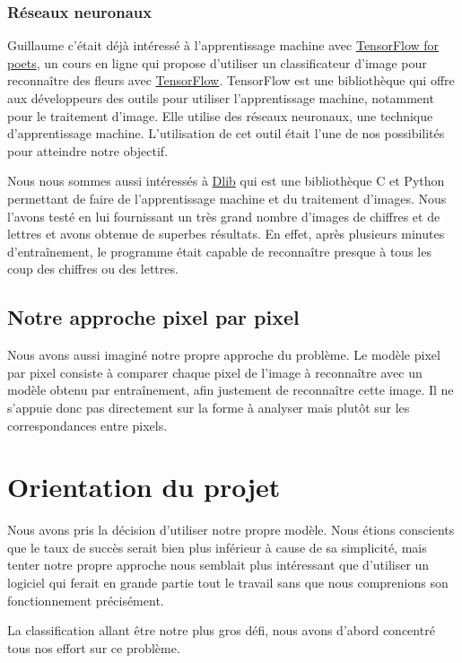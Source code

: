 \documentclass[a4paper, 12pt]{article}
\begin{document}
\subsubsection{Réseaux neuronaux}
Guillaume c'était déjà intéressé à l'apprentissage machine avec \href{https://codelabs.developers.google.com/codelabs/tensorflow-for-poets/}{TensorFlow for poets}, un cours en ligne qui propose d'utiliser un classificateur d'image pour reconnaître des fleurs avec \href{https://www.tensorflow.org/}{TensorFlow}. TensorFlow est une bibliothèque qui offre aux développeurs des outils pour utiliser l'apprentissage machine, notamment pour le traitement d'image. Elle utilise des réseaux neuronaux, une technique d'apprentissage machine. L'utilisation de cet outil était l'une de nos possibilités pour atteindre notre objectif.

Nous nous sommes aussi intéressés à \href{http://dlib.net}{Dlib} qui est une bibliothèque C et Python permettant de faire de l'apprentissage machine et du traitement d'images. Nous l'avons testé en lui fournissant un très grand nombre d'images de chiffres et de lettres et avons obtenue de superbes résultats. En effet, après plusieurs minutes d'entraînement, le programme était capable de reconnaître presque à tous les coup des chiffres ou des lettres.

\subsection{Notre approche pixel par pixel}
Nous avons aussi imaginé notre propre approche du problème. Le modèle pixel par pixel consiste à comparer chaque pixel de l'image à reconnaître avec un modèle obtenu par entraînement, afin justement de reconnaître cette image. Il ne s'appuie donc pas directement sur la forme à analyser mais plutôt sur les correspondances entre pixels.

\section{Orientation du projet}
Nous avons pris la décision d'utiliser notre propre modèle. Nous étions conscients que le taux de succès serait bien plus inférieur à cause de sa simplicité, mais tenter notre propre approche nous semblait plus intéressant que d'utiliser un logiciel qui ferait en grande partie tout le travail sans que nous comprenions son fonctionnement précisément.

La classification allant être notre plus gros défi, nous avons d'abord concentré tous nos effort sur ce problème.
\end{document}
